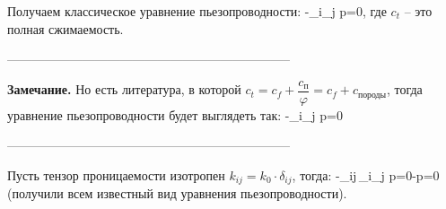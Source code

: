 Получаем классическое уравнение пьезопроводности:
\beq
{}-\partial_i\partial_j p=0,
\eeq
где $c_t$ -- это полная сжимаемость.

--------------------------------------------------------------------

\textbf{Замечание.} Но есть литература, в которой $c_t=c_f+\dfrac{c_\text{п}}{\varphi}=c_f+c_{\text{породы}}$, тогда уравнение пьезопроводности будет выглядеть так:
\beq
{}-\partial_i\partial_j p=0
\eeq

--------------------------------------------------------------------

Пусть тензор проницаемости изотропен $k_{ij}=k_0\cdot\delta_{ij}$, тогда:
\beq
{}-\delta_{ij}\,\partial_i\partial_j p=0\Leftrightarrow{}-\Delta p=0
\eeq
(получили всем известный вид уравнения пьезопроводности).

